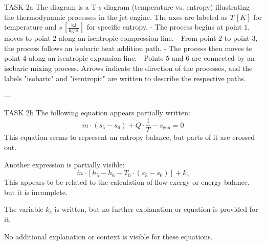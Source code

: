 TASK 2a  
The diagram is a T-s diagram (temperature vs. entropy) illustrating the thermodynamic processes in the jet engine. The axes are labeled as \( T \, [K] \) for temperature and \( s \, [\frac{\text{kJ}}{\text{kg} \cdot \text{K}}] \) for specific entropy.  
- The process begins at point \( 1 \), moves to point \( 2 \) along an isentropic compression line.  
- From point \( 2 \) to point \( 3 \), the process follows an isobaric heat addition path.  
- The process then moves to point \( 4 \) along an isentropic expansion line.  
- Points \( 5 \) and \( 6 \) are connected by an isobaric mixing process.  
Arrows indicate the direction of the processes, and the labels "isobaric" and "isentropic" are written to describe the respective paths.

---

TASK 2b  
The following equation appears partially written:  
\[
\dot{m} \cdot (s_5 - s_6) + \dot{Q} \cdot \frac{1}{T} - s_{\text{gen}} = 0
\]  
This equation seems to represent an entropy balance, but parts of it are crossed out.  

Another expression is partially visible:  
\[
\dot{m} \cdot [h_5 - h_6 - T_0 \cdot (s_5 - s_0)] + k_e
\]  
This appears to be related to the calculation of flow exergy or energy balance, but it is incomplete.  

The variable \( k_e \) is written, but no further explanation or equation is provided for it.  

No additional explanation or context is visible for these equations.